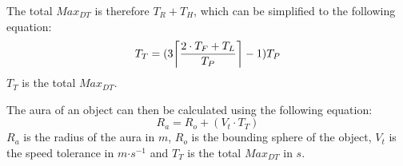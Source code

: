 The total $Max_{DT}$ is therefore $T_{R}+T_{H}$, which can be simplified to the following equation:
\begin{equation}
T_{T}=(3\ceil*{\frac{2\cdot T_{F} + T_{L}}{T_{P}}}-1)T_{P}
\end{equation}
$T_{T}$ is the total $Max_{DT}$.

The aura of an object can then be calculated using the following equation: 
\begin{equation}
R_{a}=R_{o}+(V_{t}\cdot T_{T})
\end{equation}
$R_{a}$ is the radius of the aura in $m$, $R_{o}$ is the bounding sphere of the object, $V_{t}$ is the speed tolerance in $m\mathord{\cdot}s^{-1}$ and $T_{T}$ is the total $Max_{DT}$ in $s$.

\begin{figure}[!t]	
	\begin{tikzpicture}[line cap=round,line join=round,>=triangle 45,x=1cm,y=1cm,every node/.style={font=\scriptsize,
		minimum height=0.25cm,minimum width=0.5cm},,scale=1.0]


\end{tikzpicture}
\end{figure}
